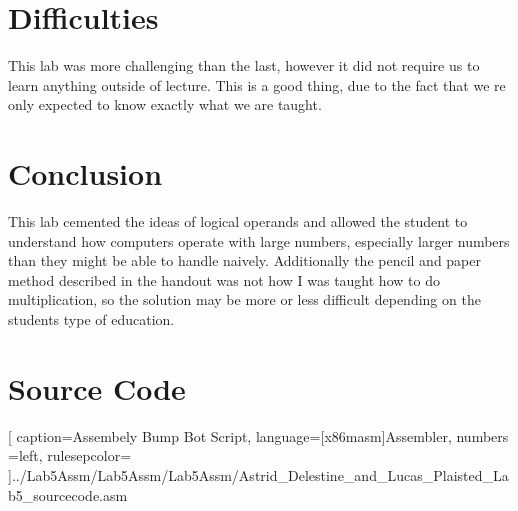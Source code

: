 \documentclass[12pt,letterpaper]{article}
\begin{document}
\section{Difficulties}
This lab was more challenging than the last, however it did not require us to learn anything outside of lecture. This is a good thing, due to the fact that we re only expected to know exactly what we are taught.

\section{Conclusion}
This lab cemented the ideas of logical operands and allowed the student to understand how computers operate with large numbers, especially larger numbers than they might be able to handle naively. Additionally the pencil and paper method described in the handout was not how I was taught how to do multiplication, so the solution may be more or less difficult depending on the students type of education.

\pagebreak

\section{Source Code}%

[
caption=Assembely Bump Bot Script,
language={[x86masm]Assembler},
numbers =left,
rulesepcolor=\color{blue}
]{../Lab5Assm/Lab5Assm/Lab5Assm/Astrid_Delestine_and_Lucas_Plaisted_Lab5_sourcecode.asm}
\end{document}
